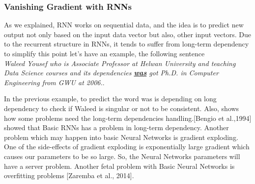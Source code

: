  \subsubsection{Vanishing Gradient with RNNs}\label{Sec:RNN_Vanishing}
 
 As we explained, RNN works on sequential data, and the idea is to predict new output not only based on the input data vector but also, other input vectors. Due to the recurrent structure in RNNs, it tends to suffer from long-term dependency to simplify this point let’s have an example, the following sentence \\
 \textit{Waleed Yousef who is Associate Professor at Helwan University and teaching Data Science courses and its dependencies \textbf{\underline{was}} got Ph.D. in Computer Engineering from GWU at 2006.}.

 In the previous example, to predict the word was is depending on long dependency to check if Waleed is singular or not to be consistent. Also, shows how some problems need the long-term dependencies handling.[Bengio et al.,1994]\cite{Bengio_1994} showed that Basic RNNs has a problem in long-term dependency.  Another problem which may happen into basic Neural Networks is gradient exploding. One of the side-effects of gradient exploding is exponentially large gradient which causes our parameters to be so large. So, the Neural Networks parameters will have a server problem. Another fetal problem with Basic Neural Networks is overfitting problems [Zaremba et al., 2014]\cite{Zaremba_et_al}.
 
